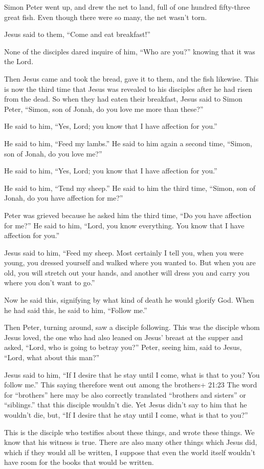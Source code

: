  Simon Peter went up, and drew the net to land, full of one
hundred fifty-three great fish. Even though there were so many, the net
wasn't torn.

 Jesus said to them, ``Come and eat breakfast!''

None of the disciples dared inquire of him, ``Who are you?'' knowing
that it was the Lord.

 Then Jesus came and took the bread, gave it to them, and
the fish likewise.  This is now the third time that Jesus
was revealed to his disciples after he had risen from the dead.
 So when they had eaten their breakfast, Jesus said to
Simon Peter, ``Simon, son of Jonah, do you love me more than these?''

He said to him, ``Yes, Lord; you know that I have affection for you.''

He said to him, ``Feed my lambs.''  He said to him again a
second time, ``Simon, son of Jonah, do you love me?''

He said to him, ``Yes, Lord; you know that I have affection for you.''

He said to him, ``Tend my sheep.''  He said to him the
third time, ``Simon, son of Jonah, do you have affection for me?''

Peter was grieved because he asked him the third time, ``Do you have
affection for me?'' He said to him, ``Lord, you know everything. You
know that I have affection for you.''

Jesus said to him, ``Feed my sheep.  Most certainly I tell
you, when you were young, you dressed yourself and walked where you
wanted to. But when you are old, you will stretch out your hands, and
another will dress you and carry you where you don't want to go.''

 Now he said this, signifying by what kind of death he
would glorify God. When he had said this, he said to him, ``Follow me.''

 Then Peter, turning around, saw a disciple following. This
was the disciple whom Jesus loved, the one who had also leaned on Jesus'
breast at the supper and asked, ``Lord, who is going to betray you?''
 Peter, seeing him, said to Jesus, ``Lord, what about this
man?''

 Jesus said to him, ``If I desire that he stay until I
come, what is that to you? You follow me.''  This saying
therefore went out among the brothers+ 21:23 The word for ``brothers''
here may be also correctly translated ``brothers and sisters'' or
``siblings.'' that this disciple wouldn't die. Yet Jesus didn't say to
him that he wouldn't die, but, ``If I desire that he stay until I come,
what is that to you?''

 This is the disciple who testifies about these things, and
wrote these things. We know that his witness is true. 
There are also many other things which Jesus did, which if they would
all be written, I suppose that even the world itself wouldn't have room
for the books that would be written.
